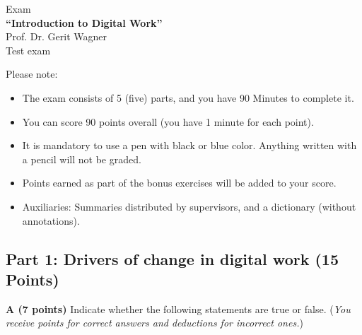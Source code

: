\documentclass[12pt]{scrartcl}
\begin{document}
\thispagestyle{firststyle}

\begin{center}
\large{Exam}\\
\vspace{0.5cm}
\large{\textbf{"`Introduction to Digital Work"'}}\\
\vspace{0.5cm}
\large{Prof. Dr. Gerit Wagner}\\
\vspace{0.5cm}
\large{Test exam}\\
\end{center}
\vspace{3cm}

Please note:
\begin{itemize}
\item The exam consists of 5 (five) parts, and you have 90 Minutes to complete it.
\item You can score 90 points overall (you have 1 minute for each point).
\item It is mandatory to use a pen with black or blue color. Anything written with a pencil will not be graded.
\item Points earned as part of the bonus exercises will be added to your score.
\item Auxiliaries: Summaries distributed by supervisors, and a dictionary (without annotations).
\end{itemize}
\vspace{2cm}


\vfill

\clearpage

\subsection*{Part 1: Drivers of change in digital work (15 Points)}

\textbf{A (7 points)} Indicate whether the following statements are true or false. (\textit{You receive points for correct answers and deductions for incorrect ones.})
\end{document}
